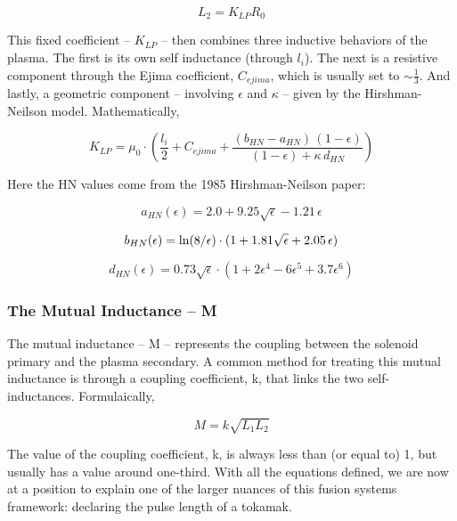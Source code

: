 \begin{equation}
	L_2 = K_{LP} R_0
\end{equation}

This fixed coefficient -- $K_{LP}$ -- then combines three inductive behaviors of the plasma. The first is its own self inductance (through $l_i$). The next is a resistive component through the Ejima coefficient, $C_{ejima}$, which is usually set to $\sim \frac{1}{3}$. And lastly, a geometric component -- involving $\epsilon$ and $\kappa$ -- given by the Hirshman-Neilson model. Mathematically,

\begin{equation}
	K_{LP} = \mu_0 \cdot \left( \frac{l_i}{2} + C_{ejima} + \frac{ ( b_{HN} - a_{HN} ) \, ( 1 - \epsilon ) }{ ( 1 - \epsilon ) + \kappa \, d_{HN} } \right)
\end{equation}

Here the HN values come from the 1985 Hirshman-Neilson paper:

\begin{equation}
	a_{HN}(\epsilon) = 2.0 + 9.25 \sqrt{\epsilon} - 1.21 \, \epsilon
\end{equation}

\begin{equation}
	b_{HN}(\epsilon) = \textnormal{ln} (8/\epsilon) \cdot ( 1 + 1.81 \sqrt{\epsilon} + 2.05 \, \epsilon )
\end{equation}

\begin{equation}
	d_{HN}(\epsilon) = 0.73 \sqrt{\epsilon}  \cdot ( 1 + 2 \epsilon^4 - 6 \epsilon^5 +3.7 \epsilon^6 )
\end{equation}

\subsubsection{The Mutual Inductance -- M}

The mutual inductance -- M -- represents the coupling between the solenoid primary and the plasma secondary. A common method for treating this mutual inductance is through a coupling coefficient, k, that links the two self-inductances. Formulaically, 

\begin{equation}
	M = k \sqrt{ L_1 L_2 }
\end{equation}

The value of the coupling coefficient, k, is always less than (or equal to) 1, but usually has a value around one-third. With all the equations defined, we are now at a position to explain one of the larger nuances of this fusion systems framework: declaring the pulse length of a tokamak.

